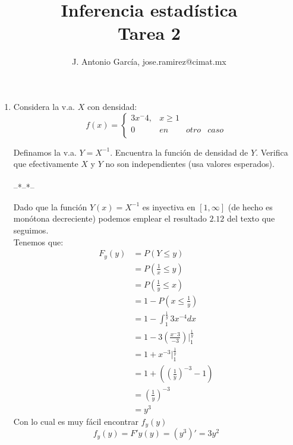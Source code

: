 \documentclass[letter]{memoir} %
\begin{document}
\title{\textbf{Inferencia estad\'istica \\Tarea 2 }}


\begin{center}
\author{J. Antonio Garc\'ia, jose.ramirez@cimat.mx}
\end{center}
\maketitle
\begin{enumerate}

\item  
Considera la v.a. $X$ con densidad:
		\[
			f(x)= \left\{ \begin{array}{llll}
							3x^-4,  &	x \geq 1&     & \\
							0  		& 	en      &otro &caso\\
							\end{array}
					\right.
		\]
        
Definamos la v.a. $Y = X^{-1}$. Encuentra la funci\'on de densidad de $Y$. Verifica que efectivamente $X$ y $Y$ no son independientes (usa valores esperados).\\\\
--*--*--
\begin{flushleft}
Dado que la función $Y(x)=X^{-1}$ es inyectiva en $[1, \infty]$ (de hecho es monótona decreciente) podemos emplear el resultado $2.12$ del texto que seguimos.\\
Tenemos que:\\
\begin{equation*}
\begin{split}
 F_y(y) &  = P (Y \leq y) \\
 		& =P(\frac{1}{x} \leq y) \\
        & = P(\frac{1}{y} \leq x)  \\
        & = 1 -P(x \leq \frac{1}{y})  \\
        & = 1 - \int_1^{\frac{1}{y}}3x^{-4} dx  \\
        & = 1- 3\left(\frac{x^-3}{-3}\right)|_1^{\frac{1}{y}} \\
        & = 1 + x^{-3}|_1^{\frac{1}{y}}  \\
        & = 1+ \left((\frac{1}{y})^{-3} -1 \right)  \\
        & =(\frac{1}{y})^{-3}  \\
        & = y^3 
\end{split}
\end{equation*}
Con lo cual es muy fácil encontrar $f_y(y)$
 \[
 	f_y(y) = F'y(y) = (y^3)' = 3y^2
 \]


\end{flushleft}
\end{enumerate}
\end{document}
